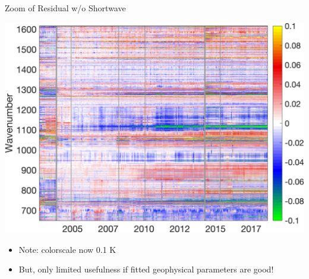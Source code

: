 \documentclass[10pt,t]{beamer}
\begin{document}
\begin{frame}[label={sec:org838d050}]{Zoom of Residual w/o Shortwave}
\begin{center}
\includegraphics[width=0.8\linewidth]{./Figs/Png/best_co2_anom_resid_no_sw.png}
\end{center}

\begin{itemize}
\item Note: colorscale now \textpm{} 0.1 K
\item But, only limited usefulness if fitted geophysical parameters are good!
\end{itemize}
\end{frame}
\end{document}
